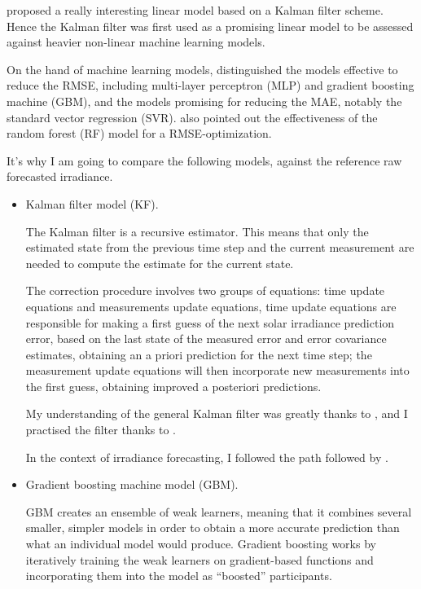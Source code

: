\cite{suksamosorn_post-processing_2021} proposed a really interesting linear model based on a Kalman filter scheme. Hence the Kalman filter was first used as a promising linear model to be 
assessed against heavier non-linear machine learning models.

On the hand of machine learning models, \cite{verbois_statistical_2022} distinguished the models effective to reduce the RMSE, including multi-layer perceptron (MLP) and gradient boosting machine (GBM),
and the models promising for reducing the MAE, notably the standard vector regression (SVR).
\cite{suksamosorn_post-processing_2021} also pointed out the effectiveness of the random forest (RF) model for a RMSE-optimization.

It's why I am going to compare the following models, against the reference raw forecasted irradiance.
\begin{itemize}
    \item Kalman filter model (KF).

The Kalman filter is a recursive estimator. This means that only the estimated state from the previous time step and the current measurement are needed to compute the estimate for the current state.

The correction procedure involves two groups of equations: time update equations
and measurements update equations, time update equations are responsible for making
a first guess of the next solar irradiance prediction error, based on the last state of the
measured error and error covariance estimates, obtaining an a priori prediction for the next
time step; the measurement update equations will then incorporate new measurements
into the first guess, obtaining improved a posteriori predictions.

My understanding of the general Kalman filter was greatly thanks to \cite{kfbasis}, and I practised the filter thanks to \cite{kfpractise}.

In the context of irradiance forecasting, I followed the path followed by \cite{suksamosorn_post-processing_2021}.
    \item Gradient boosting machine model (GBM).

GBM creates an ensemble of weak learners, meaning that it combines several smaller, simpler models in order to obtain a more accurate prediction than what an individual model would produce. Gradient boosting works by iteratively training the weak learners on gradient-based functions and incorporating them into the model as “boosted” participants. 


\end{itemize}
